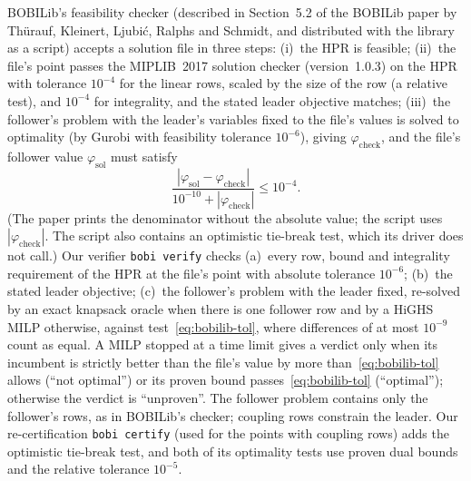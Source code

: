 BOBILib's feasibility checker (described in Section~5.2 of the BOBILib
paper by Th\"urauf, Kleinert, Ljubi\'c, Ralphs and Schmidt,\cite{thurauf2026bobilib}
and distributed with the library as a script) accepts a
solution file in three steps: (i)~the HPR is feasible; (ii)~the file's point
passes the MIPLIB~2017 solution checker\cite{gleixner2021miplib} (version~1.0.3) on the HPR with
tolerance $10^{-4}$ for the linear rows, scaled by the size of the row (a relative test), and
$10^{-4}$ for integrality, and the
stated leader objective matches; (iii)~the follower's problem with the
leader's variables fixed to the file's values is solved to optimality (by
Gurobi with feasibility tolerance $10^{-6}$), giving $\varphi_{\mathrm{check}}$,
and the file's follower value $\varphi_{\mathrm{sol}}$ must satisfy
\begin{equation}\label{eq:bobilib-tol}
  \frac{|\varphi_{\mathrm{sol}}-\varphi_{\mathrm{check}}|}{10^{-10}+|\varphi_{\mathrm{check}}|}\le 10^{-4}.
\end{equation}
(The paper prints the denominator without the absolute value; the script uses
$|\varphi_{\mathrm{check}}|$. The script also contains an optimistic tie-break
test, which its driver does not call.)
Our verifier \texttt{bobi verify} checks (a)~every row, bound and integrality
requirement of the HPR at the file's point with absolute tolerance $10^{-6}$;
(b)~the stated leader objective; (c)~the follower's problem with the leader
fixed, re-solved by an exact knapsack oracle when there is one follower row
and by a HiGHS\cite{huangfu2018parallelizing} MILP otherwise, against test~\eqref{eq:bobilib-tol}, where
differences of at most $10^{-9}$ count as equal. A MILP stopped at a time
limit gives a verdict only when its incumbent is strictly better than the
file's value by more than~\eqref{eq:bobilib-tol} allows (``not optimal'') or
its proven bound passes~\eqref{eq:bobilib-tol} (``optimal''); otherwise the
verdict is ``unproven''. The follower problem contains only the follower's
rows, as in BOBILib's checker; coupling rows constrain the leader. Our
re-certification \texttt{bobi certify} (used for the points with coupling
rows) adds the optimistic tie-break test, and both of its optimality tests
use proven dual bounds and the relative tolerance $10^{-5}$.

